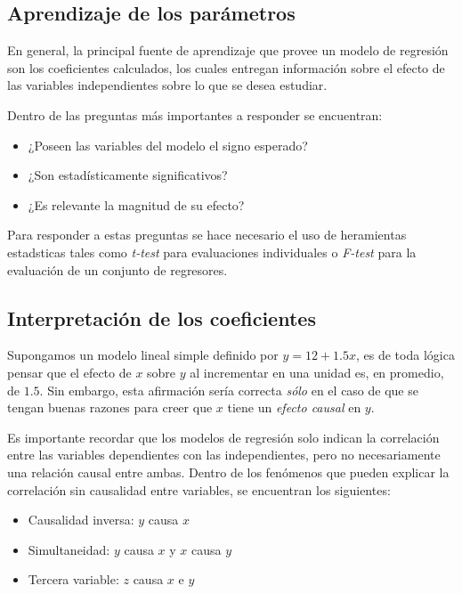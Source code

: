 \documentclass[
]{book}
\providecommand{\tightlist}{%
  \setlength{\itemsep}{0pt}\setlength{\parskip}{0pt}}
\begin{document}
\subsection{Aprendizaje de los parámetros}\label{aprendizaje-de-los-paruxe1metros}

En general, la principal fuente de aprendizaje que provee un modelo de
regresión son los coeficientes calculados, los cuales entregan
información sobre el efecto de las variables independientes sobre lo que
se desea estudiar.

Dentro de las preguntas más importantes a responder se encuentran:

\begin{itemize}
\tightlist
\item
  ¿Poseen las variables del modelo el signo esperado?
\item
  ¿Son estadísticamente significativos?
\item
  ¿Es relevante la magnitud de su efecto?
\end{itemize}

Para responder a estas preguntas se hace necesario el uso de heramientas
estadsticas tales como \emph{t-test} para evaluaciones individuales o
\emph{F-test} para la evaluación de un conjunto de regresores.

\subsection{Interpretación de los coeficientes}\label{interpretaciuxf3n-de-los-coeficientes}

Supongamos un modelo lineal simple definido por \(y = 12 + 1.5x\), es de
toda lógica pensar que el efecto de \(x\) sobre \(y\) al incrementar en una
unidad es, en promedio, de \(1.5\). Sin embargo, esta afirmación sería
correcta \emph{sólo} en el caso de que se tengan buenas razones para creer
que \(x\) tiene un \emph{efecto causal} en \(y\).

Es importante recordar que los modelos de regresión solo indican la
correlación entre las variables dependientes con las independientes,
pero no necesariamente una relación causal entre ambas. Dentro de los
fenómenos que pueden explicar la correlación sin causalidad entre
variables, se encuentran los siguientes:

\begin{itemize}
\tightlist
\item
  Causalidad inversa: \(y\) causa \(x\)
\item
  Simultaneidad: \(y\) causa \(x\) y \(x\) causa \(y\)
\item
  Tercera variable: \(z\) causa \(x\) e \(y\)
\end{itemize}
\end{document}
